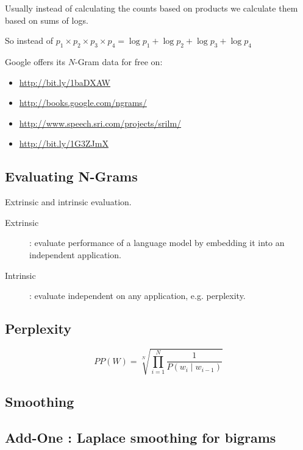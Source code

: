 Usually instead of calculating the counts based on products we calculate them based on sums of logs.

So instead of  $p_1 \times p_2 \times p_3 \times p_4 = \log p_1 + \log p_2 + \log p_3 + \log p_4$

Google offers its $N$-Gram data for free on:

\begin{itemize}
  \item \url{http://bit.ly/1baDXAW} %
  \item \url{http://books.google.com/ngrams/}
  \item	\url{http://www.speech.sri.com/projects/srilm/}
  \item	\url{http://bit.ly/1G3ZJmX} %
\end{itemize}

\subsection*{Evaluating N-Grams}

Extrinsic and intrinsic evaluation.

\begin{description}
  \item [Extrinsic]: evaluate performance of a language model by embedding it into an independent application.
  \item [Intrinsic]: evaluate independent on any application, e.g. perplexity.
\end{description}

\subsection*{Perplexity}

\begin{equation}
  PP(W) = \sqrt[N]{\prod_{i=1}^{N}\frac{1}{P(w_i \mid w_{i-1})}}
  \label{eq:ppw}
\end{equation}

\subsection*{Smoothing}
\subsection*{Add-One : Laplace smoothing  for bigrams}


